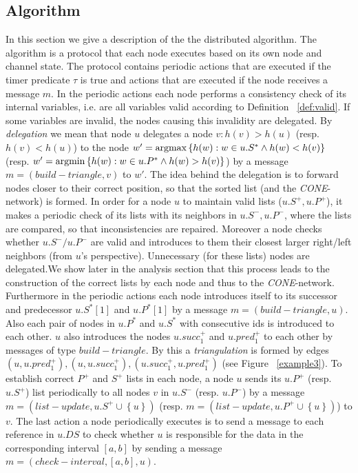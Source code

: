 \documentclass[11pt]{article}
\def\argmin{{\rm argmin}}
\def\argmax{{\rm argmax}}
\begin{document}
\subsection{Algorithm}\label{app:alg}
In this section we give a description of the the distributed algorithm. The
algorithm is a protocol that each node executes based on its own node and
channel state. The protocol contains periodic actions that are executed if
the timer predicate $\tau$ is true and actions that are executed if the node
receives a message $m$.
In the periodic actions each node performs a consistency check of its
internal variables, i.e. are all variables valid according to Definition
~\ref{def:valid}. If some variables are invalid, the nodes causing this
invalidity are delegated. By \emph{delegation} we mean that node $u$
delegates a node $v: h(v)>h(u)$ (resp. $h(v)<h(u)$) to the node $w'=\argmax \left\{h(w) : w \in
u.S^* \wedge h(w)<h(v)\right\}$ (resp. $w'=\argmin \left\{h(w): w \in u.P^* \wedge h(w)>h(v)\right\}$) by a message
$m=(build-triangle,v)$ to $w'$. The idea behind the delegation is to forward nodes closer to their correct position, so that the sorted list (and the \emph{CONE}-network) is formed.
In order for a node $u$ to maintain valid lists ($u.S^+,u.P^+$), it makes a periodic check of its lists with its neighbors in $u.S^-,u.P^-$, where the lists are compared, so that inconsistencies
are repaired. Moreover a node checks whether $u.S^-/u.P^-$ are valid and introduces to them their closest larger right/left neighbors (from $u$'s perspective).
Unnecessary (for these lists) nodes are delegated.We show later in the analysis section that this process leads to the construction of the correct lists by each node and thus to the \emph{CONE}-network. 
Furthermore in the periodic actions each node introduces itself to its successor and predecessor $u.S^*[1]$ and $u.P^*[1]$ by a message $m=(build-triangle,u)$. Also each pair of nodes in $u.P^*$ and $u.S^*$ with consecutive ids is introduced to each other. $u$ also introduces the nodes $u.succ^+_1$ and $u.pred^+_1$ to each other by messages of type $build-triangle$. By this a \emph{triangulation} is formed by edges
$(u,u.pred^+_1), (u,u.succ^+_1), (u.succ^+_1,u.pred^+_1)$ (see Figure ~\ref{example3}).
To establish correct $P^+$ and $S^+$ lists in each node, a node $u$ sends its
$u.P^+$ (resp. $u.S^+$) list periodically to all nodes $v$ in $u.S^-$ (resp.
$u.P^-$) by a message $m=(list-update,u.S^+ \cup \left\{u\right\})$ (resp.
$m=(list-update,u.P^+\cup \left\{u\right\})$) to $v$.
The last action a node periodically executes is to send a message to each
reference in $u.DS$ to check whether $u$ is responsible for the data in the
corresponding interval $[a,b]$ by sending a message
$m=(check-interval,[a,b],u)$.
\end{document}
